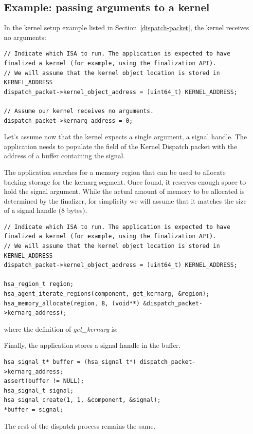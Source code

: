 \documentclass[final,oneside]{book}
\begin{document}
\subsection{Example: passing arguments to a kernel}\label{ex:kernarg_dispatch}
In the kernel setup example listed in Section~\ref{dispatch-packet}, the kernel
receives no arguments:
\begin{lstlisting}
// Indicate which ISA to run. The application is expected to have finalized a kernel (for example, using the finalization API).
// We will assume that the kernel object location is stored in KERNEL_ADDRESS
dispatch_packet->kernel_object_address = (uint64_t) KERNEL_ADDRESS;

// Assume our kernel receives no arguments.
dispatch_packet->kernarg_address = 0;
\end{lstlisting}
Let's assume now that the kernel expects a single argument, a signal handle. The
application needs to populate the
 field of the Kernel
Dispatch packet with the address of a buffer containing the signal.

The application searches for a memory region that can be used to allocate
backing storage for the kernarg segment. Once found, it reserves enough space to
hold the signal argument. While the actual amount of memory to be allocated is
determined by the finalizer, for simplicity we will assume that it matches the
size of a signal handle (8 bytes).
\begin{lstlisting}
// Indicate which ISA to run. The application is expected to have finalized a kernel (for example, using the finalization API).
// We will assume that the kernel object location is stored in KERNEL_ADDRESS
dispatch_packet->kernel_object_address = (uint64_t) KERNEL_ADDRESS;

hsa_region_t region;
hsa_agent_iterate_regions(component, get_kernarg, &region);
hsa_memory_allocate(region, 8, (void**) &dispatch_packet->kernarg_address);
\end{lstlisting}
where the definition of \textit{get_kernarg} is:


Finally, the application stores a signal handle in the buffer.
\begin{lstlisting}
hsa_signal_t* buffer = (hsa_signal_t*) dispatch_packet->kernarg_address;
assert(buffer != NULL);
hsa_signal_t signal;
hsa_signal_create(1, 1, &component, &signal);
*buffer = signal;
\end{lstlisting}
The rest of the dispatch process remains the same.
\end{document}
